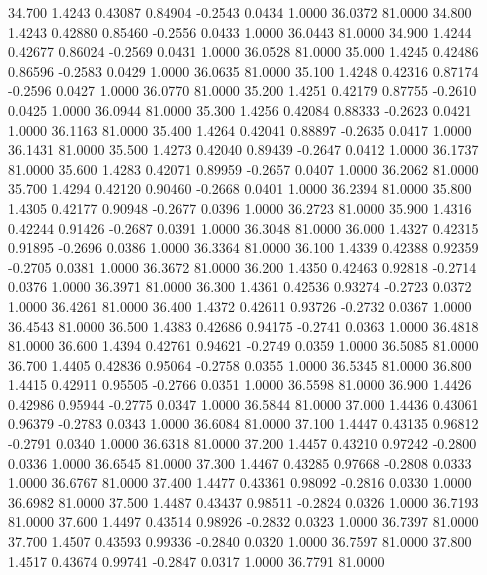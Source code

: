   34.700   1.4243   0.43087   0.84904  -0.2543   0.0434   1.0000  36.0372  81.0000
  34.800   1.4243   0.42880   0.85460  -0.2556   0.0433   1.0000  36.0443  81.0000
  34.900   1.4244   0.42677   0.86024  -0.2569   0.0431   1.0000  36.0528  81.0000
  35.000   1.4245   0.42486   0.86596  -0.2583   0.0429   1.0000  36.0635  81.0000
  35.100   1.4248   0.42316   0.87174  -0.2596   0.0427   1.0000  36.0770  81.0000
  35.200   1.4251   0.42179   0.87755  -0.2610   0.0425   1.0000  36.0944  81.0000
  35.300   1.4256   0.42084   0.88333  -0.2623   0.0421   1.0000  36.1163  81.0000
  35.400   1.4264   0.42041   0.88897  -0.2635   0.0417   1.0000  36.1431  81.0000
  35.500   1.4273   0.42040   0.89439  -0.2647   0.0412   1.0000  36.1737  81.0000
  35.600   1.4283   0.42071   0.89959  -0.2657   0.0407   1.0000  36.2062  81.0000
  35.700   1.4294   0.42120   0.90460  -0.2668   0.0401   1.0000  36.2394  81.0000
  35.800   1.4305   0.42177   0.90948  -0.2677   0.0396   1.0000  36.2723  81.0000
  35.900   1.4316   0.42244   0.91426  -0.2687   0.0391   1.0000  36.3048  81.0000
  36.000   1.4327   0.42315   0.91895  -0.2696   0.0386   1.0000  36.3364  81.0000
  36.100   1.4339   0.42388   0.92359  -0.2705   0.0381   1.0000  36.3672  81.0000
  36.200   1.4350   0.42463   0.92818  -0.2714   0.0376   1.0000  36.3971  81.0000
  36.300   1.4361   0.42536   0.93274  -0.2723   0.0372   1.0000  36.4261  81.0000
  36.400   1.4372   0.42611   0.93726  -0.2732   0.0367   1.0000  36.4543  81.0000
  36.500   1.4383   0.42686   0.94175  -0.2741   0.0363   1.0000  36.4818  81.0000
  36.600   1.4394   0.42761   0.94621  -0.2749   0.0359   1.0000  36.5085  81.0000
  36.700   1.4405   0.42836   0.95064  -0.2758   0.0355   1.0000  36.5345  81.0000
  36.800   1.4415   0.42911   0.95505  -0.2766   0.0351   1.0000  36.5598  81.0000
  36.900   1.4426   0.42986   0.95944  -0.2775   0.0347   1.0000  36.5844  81.0000
  37.000   1.4436   0.43061   0.96379  -0.2783   0.0343   1.0000  36.6084  81.0000
  37.100   1.4447   0.43135   0.96812  -0.2791   0.0340   1.0000  36.6318  81.0000
  37.200   1.4457   0.43210   0.97242  -0.2800   0.0336   1.0000  36.6545  81.0000
  37.300   1.4467   0.43285   0.97668  -0.2808   0.0333   1.0000  36.6767  81.0000
  37.400   1.4477   0.43361   0.98092  -0.2816   0.0330   1.0000  36.6982  81.0000
  37.500   1.4487   0.43437   0.98511  -0.2824   0.0326   1.0000  36.7193  81.0000
  37.600   1.4497   0.43514   0.98926  -0.2832   0.0323   1.0000  36.7397  81.0000
  37.700   1.4507   0.43593   0.99336  -0.2840   0.0320   1.0000  36.7597  81.0000
  37.800   1.4517   0.43674   0.99741  -0.2847   0.0317   1.0000  36.7791  81.0000
